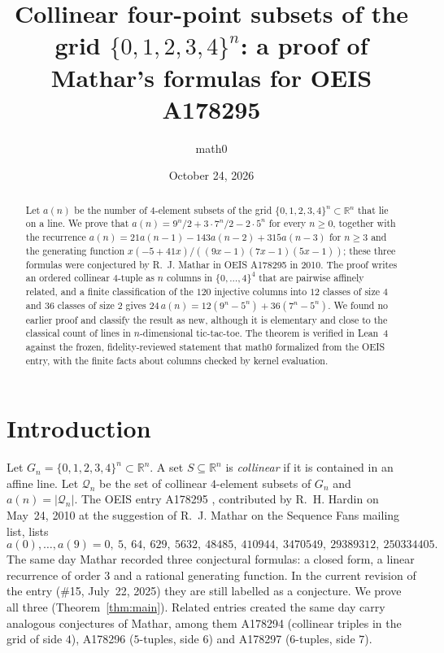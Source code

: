 \documentclass[11pt]{amsart}
\title[Collinear four-point subsets of $\{0,\dots,4\}^n$]{Collinear four-point subsets of the grid $\{0,1,2,3,4\}^n$: a proof of Mathar's formulas for OEIS A178295}
\author{math0}
\date{October 24, 2026}
\theoremstyle{plain}
\theoremstyle{definition}
\newcommand{\R}{\mathbb{R}}
\newcommand{\cQ}{\mathcal{Q}}
\begin{document}
\begin{abstract}
Let $a(n)$ be the number of $4$-element subsets of the grid $\{0,1,2,3,4\}^n\subset\R^n$ that lie on a line. We prove that $a(n)=9^n/2+3\cdot7^n/2-2\cdot5^n$ for every $n\ge0$, together with the recurrence $a(n)=21a(n-1)-143a(n-2)+315a(n-3)$ for $n\ge3$ and the generating function $x(-5+41x)/((9x-1)(7x-1)(5x-1))$; these three formulas were conjectured by R.~J. Mathar in OEIS A178295 in 2010.
The proof writes an ordered collinear $4$-tuple as $n$ columns in $\{0,\dots,4\}^4$ that are pairwise affinely related, and a finite classification of the $120$ injective columns into $12$ classes of size $4$ and $36$ classes of size $2$ gives $24\,a(n)=12(9^n-5^n)+36(7^n-5^n)$.
We found no earlier proof and classify the result as new, although it is elementary and close to the classical count of lines in $n$-dimensional tic-tac-toe.
The theorem is verified in Lean~4 against the frozen, fidelity-reviewed statement that math0 formalized from the OEIS entry, with the finite facts about columns checked by kernel evaluation.
\end{abstract}
\maketitle

\section{Introduction}

Let $G_n=\{0,1,2,3,4\}^n\subset\R^n$. A set $S\subseteq\R^n$ is \emph{collinear} if it is contained in an affine line. Let $\cQ_n$ be the set of collinear $4$-element subsets of $G_n$ and $a(n)=|\cQ_n|$.
The OEIS entry A178295 \cite{A178295}, contributed by R.~H. Hardin on May~24, 2010 at the suggestion of R.~J. Mathar on the Sequence Fans mailing list, lists
\[
a(0),\dots,a(9)=0,\ 5,\ 64,\ 629,\ 5632,\ 48485,\ 410944,\ 3470549,\ 29389312,\ 250334405 .
\]
The same day Mathar recorded three conjectural formulas: a closed form, a linear recurrence of order $3$ and a rational generating function. In the current revision of the entry (\#15, July~22, 2025) they are still labelled as a conjecture. We prove all three (Theorem~\ref{thm:main}).
Related entries created the same day carry analogous conjectures of Mathar, among them A178294 \cite{A178294} (collinear triples in the grid of side $4$), A178296 \cite{A178296} ($5$-tuples, side $6$) and A178297 \cite{A178297} ($6$-tuples, side $7$).
\end{document}

